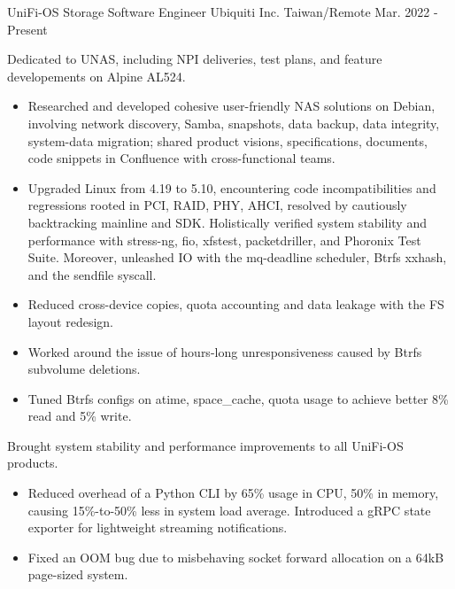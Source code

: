 

\begin{cventries}

  \cventry
    {UniFi-OS Storage Software Engineer} %
    {Ubiquiti Inc.} %
    {Taiwan/Remote} %
    {Mar. 2022 - Present} %
    {
      \begin{cvitems} %
        \item Dedicated to UNAS, including NPI deliveries, test plans, and
          feature developements on Alpine AL524.
        \begin{itemize}
          \item Researched and developed cohesive user-friendly NAS solutions
            on Debian, involving network discovery, Samba, snapshots, data
            backup, data integrity, system-data migration; shared product
            visions, specifications, documents, code snippets in Confluence with
            cross-functional teams.
          \item Upgraded Linux from 4.19 to 5.10, encountering code
            incompatibilities and regressions rooted in PCI, RAID, PHY, AHCI,
            resolved by cautiously backtracking mainline and SDK. Holistically
            verified system stability and performance with stress-ng, fio,
            xfstest, packetdriller, and Phoronix Test Suite. Moreover,
            unleashed IO with the mq-deadline scheduler, Btrfs xxhash, and the
            sendfile syscall.
          \item Reduced cross-device copies, quota accounting and data leakage
            with the FS layout redesign.
          \item Worked around the issue of hours-long unresponsiveness caused
            by Btrfs subvolume deletions.
          \item Tuned Btrfs configs on atime, space\_cache, quota usage to
            achieve better 8\% read and 5\% write.
        \end{itemize}
        \item Brought system stability and performance improvements to all
          UniFi-OS products.
        \begin{itemize}
          \item Reduced overhead of a Python CLI by 65\% usage in CPU, 50\% in
            memory, causing 15\%-to-50\% less in system load average.
            Introduced a gRPC state exporter for lightweight streaming
            notifications.
          \item Fixed an OOM bug due to misbehaving socket forward allocation on
            a 64kB page-sized system.
        \end{itemize}
      \end{cvitems}
    }


\end{cventries}

